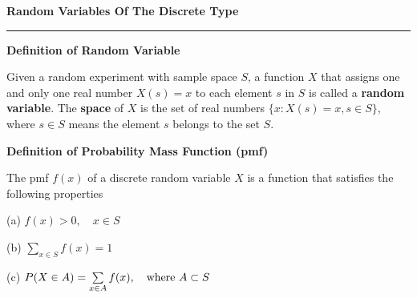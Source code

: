 \nopagenumbers
{\bf Random Variables Of The Discrete Type}
\vskip 1mm
\hrule

\vskip 6pt
{\bf Definition of Random Variable}

\vskip 1mm
Given a random experiment with sample space $S$, a function $X$ that assigns one and only one real number $X(s)=x$ to each element $s$ in $S$ is called a {\bf random variable}. The {\bf space} of $X$ is the set of real numbers $\{ x:X(s)=x, s\in S\}$, where $s\in S$ means the element $s$ belongs to the set $S$.

\vskip 1cm
{\bf Definition of Probability Mass Function (pmf)}

\vskip 1mm
The pmf $f(x)$ of a discrete random variable $X$ is a function that satisfies the following properties

\vskip 1mm
(a) $f(x)>0,\quad x\in S$

\vskip 2mm
(b) $\sum\limits_{x\in S}f(x)=1$

\vskip 2mm
(c) $P(X\in A)=\sum\limits_{x\in A}f(x),\quad\hbox{where $A\subset S$}$






\filbreak


\vfill\eject
\bye
